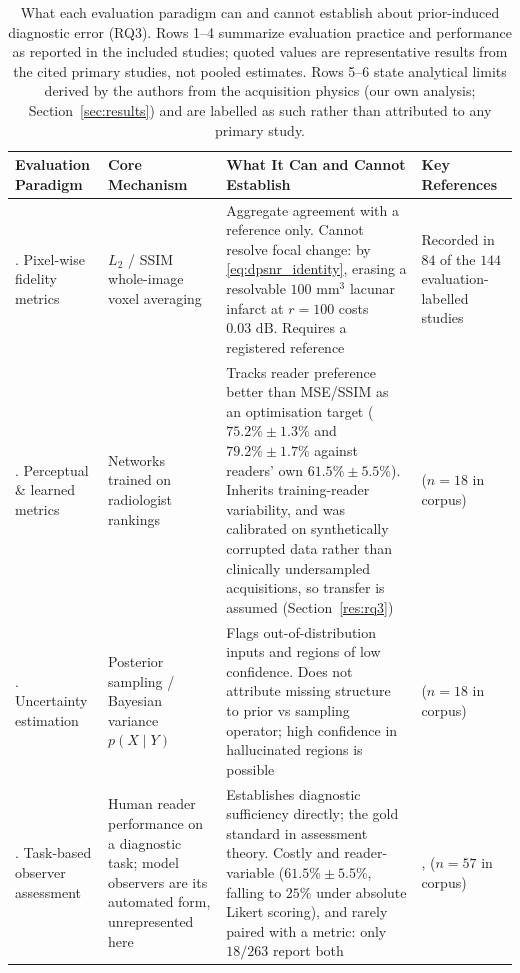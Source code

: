 \documentclass[review,authoryear]{elsarticle}
\begin{document}
\begin{table}[htbp]
\centering
\caption{What each evaluation paradigm can and cannot establish about prior-induced diagnostic error (RQ3). Rows 1--4 summarize evaluation practice and performance as reported in the included studies; quoted values are representative results from the cited primary studies, not pooled estimates. Rows 5--6 state analytical limits derived by the authors from the acquisition physics (our own analysis; Section~\ref{sec:results}) and are labelled as such rather than attributed to any primary study.}
\label{tab:rq3_metrics}
\scriptsize
\setlength{\tabcolsep}{3pt}
\renewcommand{\arraystretch}{1.0}
\begin{tabular}{>{\raggedright\arraybackslash}p{} >{\raggedright\arraybackslash}p{} >{\raggedright\arraybackslash}p{} >{\raggedright\arraybackslash}p{}}
\hline
\textbf{Evaluation Paradigm} & \textbf{Core Mechanism} & \textbf{What It Can and Cannot Establish} & \textbf{Key References} \\
\hline
1. Pixel-wise fidelity metrics & $L_2$ / SSIM whole-image voxel averaging & Aggregate agreement with a reference only. Cannot resolve focal change: by \eqref{eq:dpsnr_identity}, erasing a resolvable $100\text{ mm}^3$ lacunar infarct at $r=100$ costs $0.03\text{ dB}$. Requires a registered reference & Recorded in $84$ of the $144$ evaluation-labelled studies \\
\hline
2. Perceptual \& learned metrics & Networks trained on radiologist rankings & Tracks reader preference better than MSE/SSIM as an optimisation target ($75.2\%\pm1.3\%$ and $79.2\%\pm1.7\%$ against readers' own $61.5\%\pm5.5\%$). Inherits training-reader variability, and was calibrated on synthetically corrupted data rather than clinically undersampled acquisitions, so transfer is assumed (Section~\ref{res:rq3}) & \citet{tang2025incorporating} ($n=18$ in corpus) \\
\hline
3. Uncertainty estimation & Posterior sampling / Bayesian variance $p(X \mid Y)$ & Flags out-of-distribution inputs and regions of low confidence. Does not attribute missing structure to prior vs sampling operator; high confidence in hallucinated regions is possible & \citet{khawaled2024npbrec} ($n=18$ in corpus) \\
\hline
4. Task-based observer assessment & Human reader performance on a diagnostic task; model observers are its automated form, unrepresented here \citep{barrett1993model,barrett2004foundations,icru54} & Establishes diagnostic sufficiency directly; the gold standard in assessment theory. Costly and reader-variable ($61.5\%\pm5.5\%$, falling to $25\%$ under absolute Likert scoring), and rarely paired with a metric: only $18/263$ report both & \citet{radmanesh2022exploring}, \citet{lang2024ultrafast} ($n=57$ in corpus) \\

\end{tabular}
\end{table}
\end{document}
